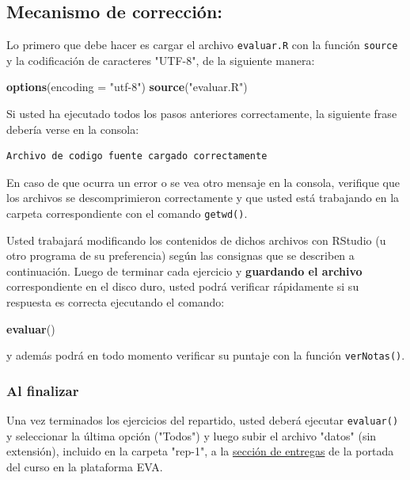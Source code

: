 \documentclass[]{article}
\newenvironment{Shaded}{}{}
\newcommand{\KeywordTok}[1]{\textcolor[rgb]{0.00,0.44,0.13}{\textbf{{#1}}}}
\newcommand{\DataTypeTok}[1]{\textcolor[rgb]{0.56,0.13,0.00}{{#1}}}
\newcommand{\StringTok}[1]{\textcolor[rgb]{0.25,0.44,0.63}{{#1}}}
\newcommand{\NormalTok}[1]{{#1}}
\begin{document}
\subsection{Mecanismo de corrección:}

Lo primero que debe hacer es cargar el archivo \texttt{evaluar.R} con la
función \texttt{source} y la codificación de caracteres "UTF-8", de la siguiente manera:

\begin{Shaded}
\begin{Highlighting}[]
\KeywordTok{options}\NormalTok{(}\DataTypeTok{encoding = }\StringTok{"utf-8"}\NormalTok{)}
\KeywordTok{source}\NormalTok{(}\StringTok{"evaluar.R"}\NormalTok{)}
\end{Highlighting}
\end{Shaded}
Si usted ha ejecutado todos los pasos anteriores correctamente, la
siguiente frase debería verse en la consola:

\begin{verbatim}
Archivo de codigo fuente cargado correctamente
\end{verbatim}
En caso de que ocurra un error o se vea otro mensaje en la consola,
verifique que los archivos se descomprimieron correctamente y que usted
está trabajando en la carpeta correspondiente con el comando
\texttt{getwd()}.

Usted trabajará modificando los contenidos de dichos archivos con
RStudio (u otro programa de su preferencia) según las consignas que se
describen a continuación. Luego de terminar cada ejercicio y \textbf{guardando el 
archivo} correspondiente en el disco duro, usted podrá verificar rápidamente si
su respuesta es correcta ejecutando el comando:

\begin{Shaded}
\begin{Highlighting}[]
\KeywordTok{evaluar}\NormalTok{()}
\end{Highlighting}
\end{Shaded}
y además podrá en todo momento verificar su puntaje con la función
\texttt{verNotas()}.

\subsubsection{Al finalizar}

Una vez terminados los ejercicios del repartido, usted
deberá ejecutar \texttt{evaluar()} y seleccionar la última opción ("Todos") y 
luego subir el archivo "datos" (sin extensión), incluido en la carpeta "rep-1",
a la \href{http://eva.universidad.edu.uy/mod/assignment/view.php?id=93616}{sección
de entregas} de la portada del curso en la plataforma EVA.
\end{document}
